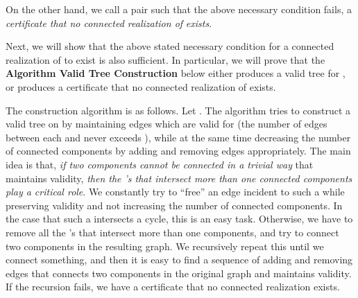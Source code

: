 \documentclass[12pt,a4paper]{article}
\theoremstyle{definition}
\theoremstyle{plain}
\begin{document}
On the other hand, we call a pair   such that
the above necessary condition fails,
a {\it certificate that no connected realization of }
 {\it exists}.

Next, we will show that the above stated necessary condition
for a connected realization of  to exist
is also sufficient.
In particular, we will prove that the  
{\bf Algorithm Valid Tree Construction} below
either produces a valid tree  for
,
or produces a certificate 
that no connected realization of  exists.


The construction algorithm is as follows.
Let .
The algorithm tries to construct a valid tree on 
by maintaining  edges which
are valid for 
(the number of edges between each 
and  never exceeds ),
while at the same time decreasing the number of connected components
by adding and removing edges appropriately.
The main idea is that, {\it if two components cannot be connected
in a trivial way} that maintains validity,
{\it then the 's that intersect more than one connected
components play a critical role}.
We constantly try to ``free'' an edge incident to such a
 while preserving validity and not increasing the
number of connected components.
In the case that such a  intersects a cycle,
this is an easy task. Otherwise, we have to remove all the
's that intersect more than one components,
and try to connect two components in the resulting graph.
We recursively repeat this until we connect something,
and then it is easy to find a sequence of adding and removing edges
that connects two components in the original graph and maintains validity.
If the recursion fails, we 
have a certificate
that no connected realization exists.\medskip
\end{document}
